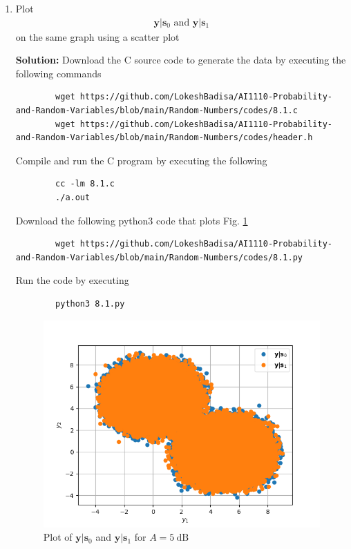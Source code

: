 \documentclass[journal,12pt,twocolumn]{IEEEtran}
\newcommand{\solution}{\noindent \textbf{Solution: }}
\providecommand{\mbf}{\mathbf}
\let\vec\mathbf
\numberwithin{equation}{section}
\renewcommand\thesection{\arabic{section}}
\begin{document}
	\begin{enumerate}[label=\thesection.\arabic*,ref=\thesection.\theenumi]
	\item Plot 
	\begin{align}
		\vec{y}|\vec{s}_0 \text{ and } \vec{y}|\vec{s}_1
	\end{align}
	on the same graph using a scatter plot
	
	\solution Download the C source code to generate the data by executing the following commands
	\begin{lstlisting}
		wget https://github.com/LokeshBadisa/AI1110-Probability-and-Random-Variables/blob/main/Random-Numbers/codes/8.1.c
		wget https://github.com/LokeshBadisa/AI1110-Probability-and-Random-Variables/blob/main/Random-Numbers/codes/header.h
	\end{lstlisting}
	Compile and run the C program by executing the following
	\begin{lstlisting}
		cc -lm 8.1.c
		./a.out
	\end{lstlisting}
	
	Download the following python3 code that plots Fig. \ref{fig-8.1} 
	\begin{lstlisting}
		wget https://github.com/LokeshBadisa/AI1110-Probability-and-Random-Variables/blob/main/Random-Numbers/codes/8.1.py
	\end{lstlisting}
	Run the code by executing
	\begin{lstlisting}
		python3 8.1.py
	\end{lstlisting}
	
	\begin{figure}
		\centering
		\includegraphics[width=\columnwidth]{./figs/8.1.png}
		\caption{Plot of $\mbf{y}|\mbf{s}_0$ and $\mbf{y}|\mbf{s}_1$ for $A = 5~\mathrm{dB}$}
		\label{fig-8.1}
	\end{figure}
	

\end{enumerate}
\end{document}
